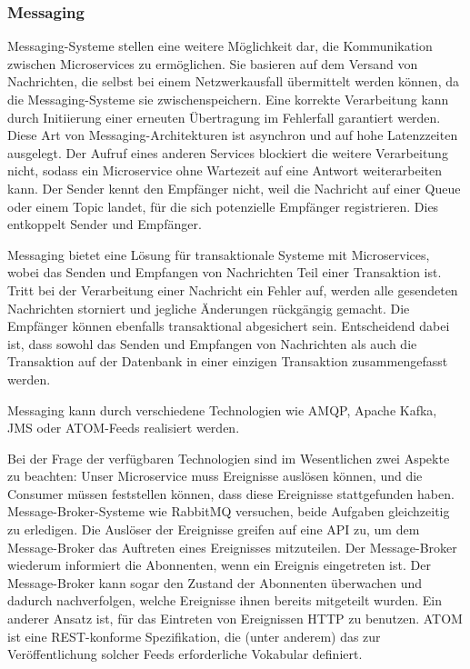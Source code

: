 {\subsubsection{Messaging}


Messaging-Systeme stellen eine weitere Möglichkeit dar, die Kommunikation zwischen Microservices zu ermöglichen. Sie basieren auf dem Versand von Nachrichten, die selbst bei einem Netzwerkausfall übermittelt werden können, da die Messaging-Systeme sie zwischenspeichern. Eine korrekte Verarbeitung kann durch Initiierung einer erneuten Übertragung im Fehlerfall garantiert werden. Diese Art von Messaging-Architekturen ist asynchron und auf hohe Latenzzeiten ausgelegt. Der Aufruf eines anderen Services blockiert die weitere Verarbeitung nicht, sodass ein Microservice ohne Wartezeit auf eine Antwort weiterarbeiten kann. Der Sender kennt den Empfänger nicht, weil die Nachricht auf einer Queue oder einem Topic landet, für die sich potenzielle Empfänger registrieren. Dies entkoppelt Sender und Empfänger. 

Messaging bietet eine Lösung für transaktionale Systeme mit Microservices, wobei das Senden und Empfangen von Nachrichten Teil einer Transaktion ist. Tritt bei der Verarbeitung einer Nachricht ein Fehler auf, werden alle gesendeten Nachrichten storniert und jegliche Änderungen rückgängig gemacht. Die Empfänger können ebenfalls transaktional abgesichert sein. Entscheidend dabei ist, dass sowohl das Senden und Empfangen von Nachrichten als auch die Transaktion auf der Datenbank in einer einzigen Transaktion zusammengefasst werden. 

Messaging kann durch verschiedene Technologien wie AMQP, Apache Kafka, JMS oder ATOM-Feeds realisiert werden.
\cite[S. 183 - 187]{wolff}

Bei der Frage der verfügbaren Technologien sind im Wesentlichen zwei Aspekte zu beachten: Unser Microservice muss Ereignisse auslösen können, und die Consumer müssen feststellen können, dass diese Ereignisse stattgefunden haben. Message-Broker-Systeme wie RabbitMQ versuchen, beide Aufgaben gleichzeitig zu erledigen. Die Auslöser der Ereignisse greifen auf eine API zu, um dem Message-Broker das Auftreten eines Ereignisses mitzuteilen. Der Message-Broker wiederum informiert die Abonnenten, wenn ein Ereignis eingetreten ist. Der Message-Broker kann sogar den Zustand der Abonnenten überwachen und dadurch nachverfolgen, welche Ereignisse ihnen bereits mitgeteilt wurden.
Ein anderer Ansatz ist, für das Eintreten von Ereignissen HTTP zu benutzen. ATOM ist eine REST-konforme Spezifikation, die (unter anderem) das zur Veröffentlichung solcher Feeds erforderliche Vokabular definiert.\cite[S.87-88]{newman}

}
